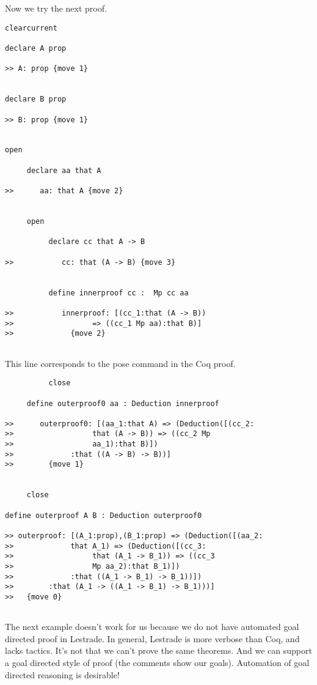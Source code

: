 \documentclass[12pt]{article}
\begin{document}
Now we try the next proof.

\begin{verbatim}
clearcurrent

declare A prop

>> A: prop {move 1}


declare B prop

>> B: prop {move 1}


open

     declare aa that A

>>      aa: that A {move 2}


     open

          declare cc that A -> B

>>           cc: that (A -> B) {move 3}


          define innerproof cc :  Mp cc aa

>>           innerproof: [(cc_1:that (A -> B)) 
>>                  => ((cc_1 Mp aa):that B)]
>>             {move 2}


\end{verbatim}

This line corresponds to the pose command in the Coq proof.

\begin{verbatim}
          close

     define outerproof0 aa : Deduction innerproof

>>      outerproof0: [(aa_1:that A) => (Deduction([(cc_2:
>>                  that (A -> B)) => ((cc_2 Mp 
>>                  aa_1):that B)])
>>             :that ((A -> B) -> B))]
>>        {move 1}


     close

define outerproof A B : Deduction outerproof0

>> outerproof: [(A_1:prop),(B_1:prop) => (Deduction([(aa_2:
>>             that A_1) => (Deduction([(cc_3:
>>                  that (A_1 -> B_1)) => ((cc_3 
>>                  Mp aa_2):that B_1)])
>>             :that ((A_1 -> B_1) -> B_1))])
>>        :that (A_1 -> ((A_1 -> B_1) -> B_1)))]
>>   {move 0}


\end{verbatim}

The next example doesn't work for us because we do not have automated goal directed proof in Lestrade.  In general, Lestrade is more verbose than Coq, and lacks tactics.
It's not that we can't prove the same theorems.  And we can support a goal directed style of proof (the comments show our goals).  Automation of goal directed reasoning is desirable!
\end{document}
